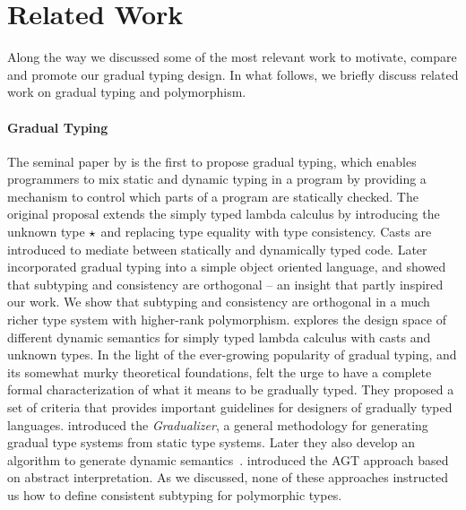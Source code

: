 
\section{Related Work}
\label{sec:related}

Along the way we discussed some of the most relevant work to motivate,
compare and
promote our gradual typing design. In what follows, we briefly discuss related
work on gradual typing and polymorphism.


\paragraph{Gradual Typing}

The seminal paper by \citet{siek2006gradual} is the first to propose gradual
typing, which enables programmers to mix static and dynamic typing in a program
by providing a mechanism to control which parts of a program are statically
checked. The original proposal extends the simply typed lambda calculus by
introducing the unknown type $\star$ and replacing type equality with type
consistency. Casts are introduced to mediate between statically and dynamically
typed code. Later \citet{siek2007gradual} incorporated gradual typing into a
simple object oriented language, and showed that subtyping and consistency are
orthogonal -- an insight that partly inspired our work. We show that subtyping
and consistency are orthogonal in a much richer type system with higher-rank
polymorphism. \citet{siek2009exploring} explores the design space of different
dynamic semantics for simply typed lambda calculus with casts and unknown types.
In the light of the ever-growing popularity of gradual typing, and its somewhat
murky theoretical foundations, \citet{siek2015refined} felt the urge to have a
complete formal characterization of what it means to be gradually typed. They
proposed a set of criteria that provides important guidelines for designers of
gradually typed languages. \citet{cimini2016gradualizer} introduced the
\emph{Gradualizer}, a general methodology for generating gradual type systems
from static type systems. Later they also develop an algorithm to generate
dynamic semantics~\cite{CiminiPOPL}. \citet{garcia2016abstracting} introduced
the AGT approach based on abstract interpretation. As we discussed, none of
these approaches instructed us how to define consistent subtyping for
polymorphic types.

